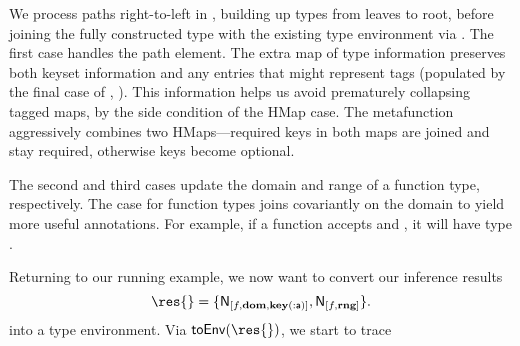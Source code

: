 We process paths right-to-left in \inferupdateOp{}, building
up types from leaves to root, before joining the fully constructed type with the existing
type environment via \joinOp{}.
The first case handles the \keypeOp{} path element.
The extra map of type information preserves both keyset
information and any entries that might represent tags
(populated by the final case of \trackEOp{}, ).
This information helps us avoid prematurely collapsing tagged maps,
by the side condition of the HMap \joinOp{} case.
The \joinHMapOp{} metafunction aggressively combines two HMaps---required
keys in both maps are joined and stay required, otherwise keys
become optional.

The second and third \inferupdateOp{} cases update the domain and range of a function type,
respectively.
The \joinOp{} case for function types joins covariantly on the domain to yield more useful
annotations. For example, if a function accepts \IntT{} and \Keyword{},
it will have type
\joinnoalign{\arrow{\IntT{}}{\UnknownT{}}}{\arrow{\Keyword{}}{\UnknownT{}}}
{\arrow{\Union{\IntT{}}{\Keyword{}}}{\UnknownT{}}}.

Returning to our running example, we now want to convert our inference results
$$
\res{} = \{\resentry{[f, \dompe{}, \inferkeypenokeyset{[\makekw{a}]}{\makekw{a}}]}{\IntT{}}, \resentry{[f, \rngpe{}]}{\IntT{}}\}.
$$
into a type environment. Via $\generatetenv{}(\res{})$, we start to trace


